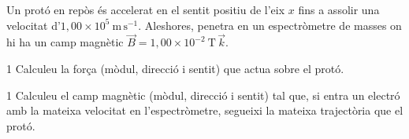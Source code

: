 Un protó en repòs és accelerat en el sentit positiu de l'eix $x$ fins a assolir una velocitat d'$1,00\times 10^{5}\ \mathrm{m\,s^{-1}}$. Aleshores, penetra en un espectròmetre de masses on hi ha un camp magnètic $\vec{B} = 1,00\times 10^{-2}\ \mathrm{T}\,\vec{k}$.

\begin{apartat}{1}
Calculeu la força (mòdul, direcció i sentit) que actua sobre el protó.
\end{apartat}

\begin{apartat}{1}
Calculeu el camp magnètic (mòdul, direcció i sentit) tal que, si entra un electró amb la mateixa velocitat en l'espectròmetre, segueixi la mateixa trajectòria que el protó.
\end{apartat}

